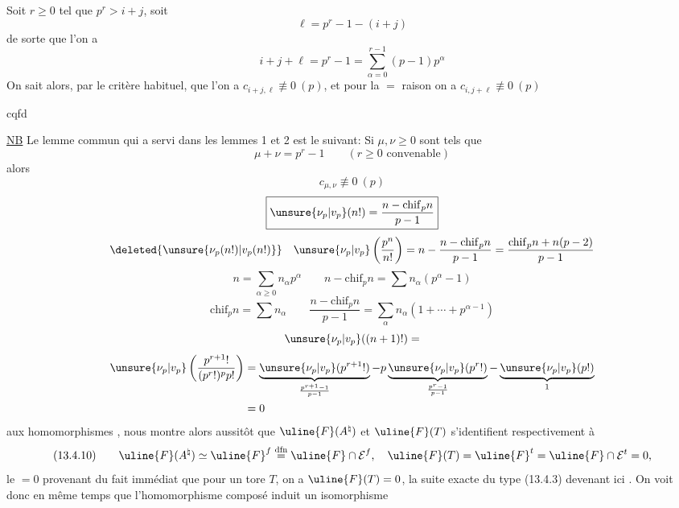 Soit $r\geq0$ tel que $p^r>i+j$, soit \deleted{$\unsure{\ell}$}
\[
\ell=p^r-1-(i+j)
\]
de sorte que l'on a
\[
i+j+\ell=p^r-1=\sum_{\alpha=0}^{r-1}(p-1)p^\alpha
\]
On sait alors, par le critère habituel, que l'on a $c_{i+j,\ell}\not\equiv0\ (p)$, et pour la $=$ raison on a $c_{i,j+\ell}\not\equiv0\ (p)$

cqfd

\uline{NB} Le lemme commun qui a servi dans les lemmes 1 et 2 est le suivant:
Si $\mu,\nu\geq0$ sont tels que
\[
\mu+\nu=p^r-1\qquad(r\geq0\text{ convenable})
\]
alors
\[
c_{\mu,\nu}\not\equiv0\ (p)
\]
\[
\boxed{\unsure{\nu_p|v_p}(n!)=\frac{n-\mathrm{chif}_p n}{p-1}}
\]
\[
\deleted{\unsure{\nu_p(n!)|v_p(n!)}}\quad \unsure{\nu_p|v_p}\left(\frac{p^n}{n!}\right)=n-\frac{n-\mathrm{chif}_p n}{p-1}=\frac{\mathrm{chif}_p n+n(p-2)}{p-1}
\]
\[
n=\sum_{\alpha\geq0}n_\alpha p^\alpha\qquad n-\mathrm{chif}_p n=\sum n_\alpha(p^\alpha-1)
\]
\[
\mathrm{chif}_p n=\sum n_\alpha\qquad\frac{n-\mathrm{chif}_p n}{p-1}=\sum_\alpha n_\alpha(1+\cdots+p^{\alpha-1})
\]
\[
\unsure{\nu_p|v_p}((n+1)!)=
\]
\[
\begin{aligned}
\unsure{\nu_p|v_p}\left(\frac{p^{r+1}!}{(p^r!)^p p!}\right)
&=\underbrace{\unsure{\nu_p|v_p}(p^{r+1}!)}_{\frac{p^{r+1}-1}{p-1}}
-p\underbrace{\unsure{\nu_p|v_p}(p^r!)}_{\frac{p^r-1}{p-1}}
-\underbrace{\unsure{\nu_p|v_p}(p!)}_{1}\\
&=0
\end{aligned}
\]
aux homomorphismes
,
\margin{$\unsure{=}$}
nous montre alors aussitôt que $\uline{F}(A^\natural)$ et $\uline{F}(T)$ s'identifient respectivement à
\[
(13.4.10)\qquad\uline{F}(A^\natural)\simeq\uline{F}^{f}\overset{\mathrm{dfn}}=\uline{F}\cap\mathcal E^{f},\quad\uline{F}(T)=\uline{F}^{t}=\uline{F}\cap\mathcal E^{t}=0,
\]
le $=0$ provenant du fait immédiat que pour un tore $T$, on a $\uline{F}(T)=0$,
la suite exacte du type (13.4.3) devenant ici
.
On voit donc en même temps que l'homomorphisme composé
\margin{$\unsure{-}$}
induit un isomorphisme

